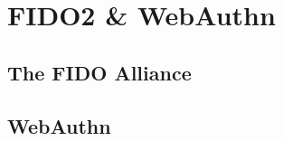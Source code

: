 
\section{FIDO2 & WebAuthn}
\label{sec:results}

\subsection{The FIDO Alliance}
\label{subsec:fido_alliance}



\subsection{WebAuthn}
\label{subsec:webauthn}


